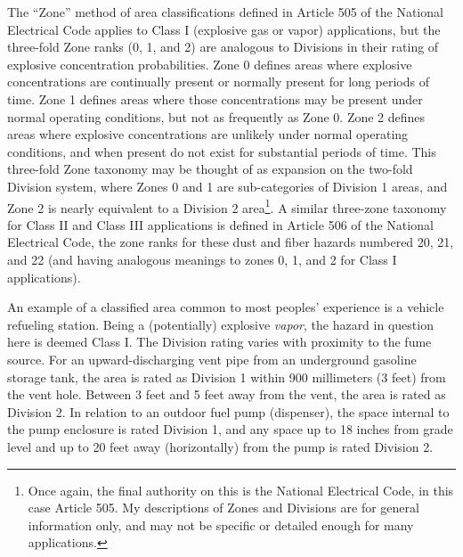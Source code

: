 The ``Zone'' method of area classifications defined in Article 505 of the National Electrical Code applies to Class I (explosive gas or vapor) applications, but the three-fold Zone ranks (0, 1, and 2) are analogous to Divisions in their rating of explosive concentration probabilities.  Zone 0 defines areas where explosive concentrations are continually present or normally present for long periods of time.  Zone 1 defines areas where those concentrations may be present under normal operating conditions, but not as frequently as Zone 0.  Zone 2 defines areas where explosive concentrations are unlikely under normal operating conditions, and when present do not exist for substantial periods of time.  This three-fold Zone taxonomy may be thought of as expansion on the two-fold Division system, where Zones 0 and 1 are sub-categories of Division 1 areas, and Zone 2 is nearly equivalent to a Division 2 area\footnote{Once again, the final authority on this is the National Electrical Code, in this case Article 505.  My descriptions of Zones and Divisions are for general information only, and may not be specific or detailed enough for many applications.}.  A similar three-zone taxonomy for Class II and Class III applications is defined in Article 506 of the National Electrical Code, the zone ranks for these dust and fiber hazards numbered 20, 21, and 22 (and having analogous meanings to zones 0, 1, and 2 for Class I applications).  

An example of a classified area common to most peoples' experience is a vehicle refueling station.  Being a (potentially) explosive \textit{vapor}, the hazard in question here is deemed Class I.  The Division rating varies with proximity to the fume source.  For an upward-discharging vent pipe from an underground gasoline storage tank, the area is rated as Division 1 within 900 millimeters (3 feet) from the vent hole.  Between 3 feet and 5 feet away from the vent, the area is rated as Division 2.  In relation to an outdoor fuel pump (dispenser), the space internal to the pump enclosure is rated Division 1, and any space up to 18 inches from grade level and up to 20 feet away (horizontally) from the pump is rated Division 2.

\filbreak

